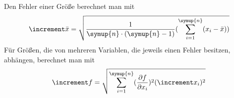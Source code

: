 \noindent Den Fehler einer Größe berechnet man mit
\begin{equation}
    \increment\bar{x}=\sqrt{\frac{1}{\symup{n}\cdot(\symup{n}-1)}(\sum_{i=1}^{\symup{n}} (x_i - \bar{x}))}
    \label{eqn:fehler}
\end{equation}
Für Größen, die von mehreren Variablen, die jeweils einen Fehler besitzen, abhängen, berechnet man mit
\begin{equation}
    \increment f=\sqrt{\sum_{i=1}^{\symup{n}} (\frac{\partial f}{\partial x_i})^2 (\increment x_i)^2}
    \label{eqn:fehlerfortpflanzung}
\end{equation}

